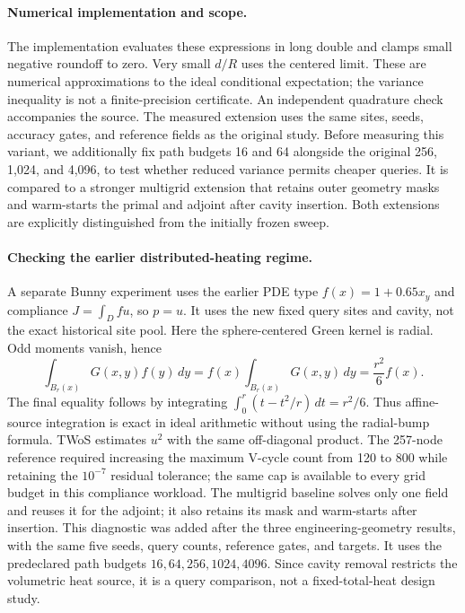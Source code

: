 \paragraph{Numerical implementation and scope.}
The implementation evaluates these expressions in long double and clamps
small negative roundoff to zero. Very small $d/R$ uses the centered limit.
These are numerical approximations to the ideal conditional expectation;
the variance inequality is not a finite-precision certificate. An independent
quadrature check accompanies the source. The measured extension uses the same
sites, seeds, accuracy gates, and reference fields as the original
study. Before measuring this variant, we additionally fix path budgets 16
and 64 alongside the original 256, 1,024, and 4,096, to test whether reduced
variance permits cheaper queries. It is compared to a stronger multigrid extension that retains outer
geometry masks and warm-starts the primal and adjoint after cavity insertion.
Both extensions are explicitly distinguished from the initially frozen sweep.

\paragraph{Checking the earlier distributed-heating regime.}
A separate Bunny experiment uses the earlier PDE type $f(x)=1+0.65x_y$
and compliance $J=\int_D fu$, so $p=u$. It uses the new fixed query sites
and cavity, not the exact historical site pool. Here the sphere-centered
Green kernel is radial. Odd moments vanish, hence
\[
 \int_{B_r(x)}G(x,y)f(y)\,dy
 =f(x)\int_{B_r(x)}G(x,y)\,dy=\frac{r^2}{6}f(x).
\]
The final equality follows by integrating
$\int_0^r(t-t^2/r)\,dt=r^2/6$. Thus affine-source integration is exact in
ideal arithmetic without using the radial-bump formula. TWoS estimates
$u^2$ with the same off-diagonal product. The 257-node reference required increasing the maximum V-cycle count from
120 to 800 while retaining the $10^{-7}$ residual tolerance; the same cap
is available to every grid budget in this compliance workload.
The multigrid baseline solves only
one field and reuses it for the adjoint; it also retains its mask and
warm-starts after insertion. This diagnostic was added after the three
engineering-geometry results, with the same five seeds, query counts,
reference gates, and targets. It uses the predeclared path budgets
$16,64,256,1024,4096$. Since cavity removal restricts the volumetric heat
source, it is a query comparison, not a fixed-total-heat design study.

